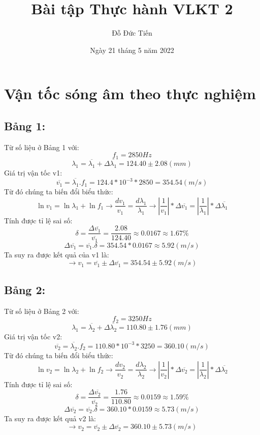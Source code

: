 \documentclass[12pt]{article}
\title{{\sffamily Bài tập Thực hành VLKT 2}}
\author{{\sffamily Đỗ Đức Tiến}}
\date{{\sffamily Ngày 21 tháng 5 năm 2022}}
\begin{document}
	\maketitle
	\section{{\sffamily Vận tốc sóng âm theo thực nghiệm}}
	\subsection{{\sffamily Bảng 1:}}
	{\sffamily Từ số liệu ở Bảng 1 với:} \[{f_1} = 2850Hz\]
	\[{\lambda _1} = \overline {{\lambda _1}}  + \Delta \overline {{\lambda _1}}  = 124.40 \pm 2.08 (mm)\]
	{{\sffamily Giá trị vận tốc v1:}}
	\[\overline {{v_1}}  = \overline {{\lambda _1}} .{f_1} = 124.4*{10^{ - 3}}*2850 = 354.54(m/s)\]
	{{\sffamily Từ đó chúng ta biến đổi biểu thức:}}
	\[\ln {v_1} = \ln {\lambda _1} + \ln {f_1} \to \frac{{d{v_1}}}{{{v_1}}} = \frac{{d{\lambda _1}}}{{{\lambda _1}}} \to \left| {\frac{1}{{{v_1}}}} \right|*\Delta \overline {{v_1}}  = \left| {\frac{1}{{{\lambda _1}}}} \right|*\Delta \overline {{\lambda _1}} \]
	{{\sffamily Tính được tỉ lệ sai số:}}
	\[\delta  = \frac{{\Delta \overline {{v_1}} }}{{\overline {{v_1}} }} = \frac{{2.08}}{{124.40}} \approx 0.0167 \approx 1.67\% \]
	\[\Delta \overline {{v_1}}  = \overline {{v_1}} .\delta  = 354.54*0.0167 \approx 5.92(m/s)\]
	{{\sffamily Ta suy ra được kết quả của v1 là:}}
	\[ \to {v_1} = \overline {{v_1}}  \pm \Delta \overline {{v_1}}  = 354.54 \pm 5.92(m/s)\]
	\subsection{{\sffamily Bảng 2:}}
	{\sffamily Từ số liệu ở Bảng 2 với:} \[{f_2} = 3250Hz\]
	\[{\lambda _1} = \overline {{\lambda _2}}  + \Delta \overline {{\lambda _2}}  = 110.80 \pm 1.76 (mm)\]
	{{\sffamily Giá trị vận tốc v2:}}
	\[\overline {{v_2}}  = \overline {{\lambda _2}} .{f_2} = 110.80*{10^{ - 3}}*3250 = 360.10(m/s)\]
	{{\sffamily Từ đó chúng ta biến đổi biểu thức:}}
	\[\ln {v_2} = \ln {\lambda _2} + \ln {f_2} \to \frac{{d{v_2}}}{{{v_2}}} = \frac{{d{\lambda _2}}}{{{\lambda _2}}} \to \left| {\frac{1}{{{v_2}}}} \right|*\Delta \overline {{v_2}}  = \left| {\frac{1}{{{\lambda _2}}}} \right|*\Delta \overline {{\lambda _2}} \]
	{{\sffamily Tính được tỉ lệ sai số:}}
	\[\delta  = \frac{{\Delta \overline {{v_2}} }}{{\overline {{v_2}} }} = \frac{{1.76}}{{110.80}} \approx 0.0159 \approx 1.59\% \]
	\[\Delta \overline {{v_2}}  = \overline {{v_2}} .\delta  = 360.10*0.0159 \approx 5.73(m/s)\]
	{{\sffamily Ta suy ra được kết quả v2 là:}}
	\[ \to {v_2} = \overline {{v_2}}  \pm \Delta \overline {{v_2}}  = 360.10 \pm 5.73(m/s)\]
\end{document}
